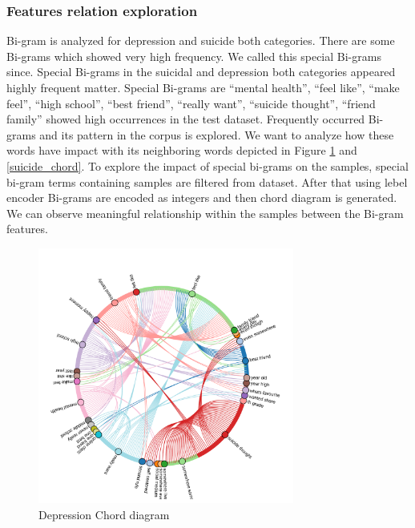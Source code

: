 \documentclass[sn-mathphys,Numbered]{sn-jnl}%
\theoremstyle{thmstyleone}%
\theoremstyle{thmstyletwo}%
\theoremstyle{thmstylethree}%
\begin{document}
\subsubsection{Features relation exploration}
Bi-gram is analyzed for depression and suicide both categories. There are some Bi-grams which showed very high frequency. We called this special Bi-grams since. Special Bi-grams in the suicidal and depression both categories appeared highly frequent matter. Special Bi-grams are \enquote{mental health}, \enquote{feel like}, \enquote{make feel}, \enquote{high school}, \enquote{best friend}, \enquote{really want}, \enquote{suicide thought}, \enquote{friend family} showed high occurrences in the test dataset. Frequently occurred Bi-grams and its pattern in the corpus is explored. We want to analyze how these words have impact with its neighboring words depicted in Figure \ref{dep_chord} and \ref{suicide_chord}. To explore the impact of special bi-grams on the samples, special bi-gram terms containing samples are filtered from dataset. After that using lebel encoder Bi-grams are encoded as integers and then chord diagram is generated. We can observe meaningful relationship within the samples between the Bi-gram features.  
\begin{figure}[H]
\centering
    \includegraphics[width=0.75\textwidth]{dep_chord.png}
    \caption{Depression Chord diagram}
    \label{dep_chord}
\end{figure}
\end{document}
